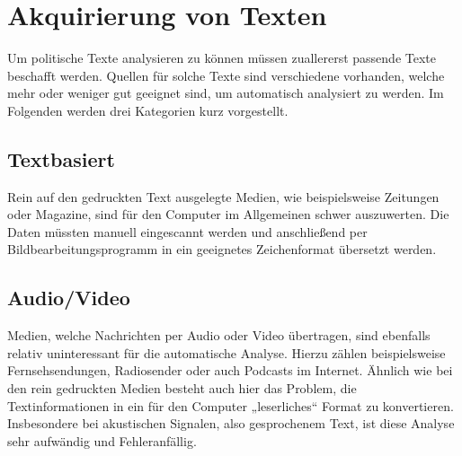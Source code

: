 \section{Akquirierung von Texten}
Um politische Texte analysieren zu können müssen zuallererst passende Texte beschafft werden. Quellen für solche Texte sind verschiedene vorhanden, welche mehr oder weniger gut geeignet sind, um automatisch analysiert zu werden. Im Folgenden werden drei Kategorien kurz vorgestellt.

\subsection{Textbasiert}
Rein auf den gedruckten Text ausgelegte Medien, wie beispielsweise Zeitungen oder Magazine, sind für den Computer im Allgemeinen schwer auszuwerten. Die Daten müssten manuell eingescannt werden und anschließend per Bildbearbeitungsprogramm in ein geeignetes Zeichenformat übersetzt werden. 

\subsection{Audio/Video}
Medien, welche Nachrichten per Audio oder Video übertragen, sind ebenfalls relativ uninteressant für die automatische Analyse. Hierzu zählen beispielsweise Fernsehsendungen, Radiosender oder auch Podcasts im Internet. Ähnlich wie bei den rein gedruckten Medien besteht auch hier das Problem, die Textinformationen in ein für den Computer „leserliches“ Format zu konvertieren. Insbesondere bei akustischen Signalen, also gesprochenem Text, ist diese Analyse sehr aufwändig und Fehleranfällig. 

